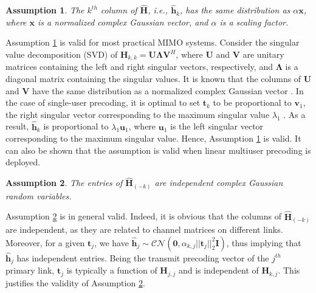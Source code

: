 \documentclass[twocolumn,10pt]{IEEEtran}
\theoremstyle{plain} \newtheorem{theorem}{Theorem}
\theoremstyle{plain} \newtheorem{proposition}{Proposition}
\theoremstyle{plain} \newtheorem{corollary}{Corollary}
\theoremstyle{remark} \newtheorem{remark}{Remark}
\theoremstyle{remark} \newtheorem{lemma}{Lemma}
\theoremstyle{plain} \newtheorem{definition}{Definition}
\theoremstyle{plain} \newtheorem{assumption}{Assumption}
\theoremstyle{plain} \newtheorem{fact}{Fact}
\begin{document}
\begin{assumption}\label{ass:1}
The $k^{th}$ column of $\hat{\mathbf{H}}$, i.e., $\mathbf{\hat{h}}_k$, has the same distribution as $\alpha \mathbf{x}$, where $\mathbf{x}$ is a normalized complex Gaussian vector, and $\alpha$ is a scaling factor.
\end{assumption}
Assumption \ref{ass:1} is valid for most practical MIMO systems. Consider the singular value decomposition (SVD) of $\mathbf{H}_{k,k}=\mathbf{U}\mathbf{\Lambda}\mathbf{V}^H$, where $\mathbf{U}$  and $\mathbf{V}$ are unitary matrices containing the left and right singular vectors, respectively, and $\mathbf{\Lambda}$ is a diagonal matrix containing the singular values. It is known that the columns of $\mathbf{U}$ and $\mathbf{V}$ have the same distribution as a normalized complex Gaussian vector \cite{MH99}. In the case of single-user precoding, it is optimal to set $\mathbf{t}_k$ to be proportional to $\mathbf{v}_1$, the right singular vector corresponding to the maximum singular value $\lambda_1$ \cite{RC98}. As a result, $\mathbf{\hat{h}}_k$ is proportional to $\lambda_1\mathbf{u}_1$, where $\mathbf{u}_1$ is the left singular vector corresponding to the maximum singular value. Hence, Assumption \ref{ass:1} is valid. It can also be shown that the assumption is valid when linear multiuser precoding is deployed.

\begin{assumption}\label{ass:2}
The entries of $\mathbf{\hat{H}}_{(-k)}$ are independent complex Gaussian random variables.
\end{assumption}
Assumption \ref{ass:2} is in general valid.  Indeed, it is obvious that the columns of $\mathbf{\hat{H}}_{(-k)}$ are independent, as they are related to channel matrices on different links. Moreover, for a given $\mathbf{t}_j$, we have $\mathbf{\hat{h}}_j\sim\mathcal{CN}(\mathbf{0}, \alpha_{k,j}||\mathbf{t}_j||_2^2\mathbf{I})$, thus implying that $\mathbf{\hat{h}}_j$ has independent entries. Being the transmit precoding vector of the $j^{th}$ primary link,  $\mathbf{t}_j$ is typically a function of $\mathbf{H}_{j,j}$ and is independent of $\mathbf{H}_{k,j}$. This justifies the validity of Assumption \ref{ass:2}.
\end{document}
